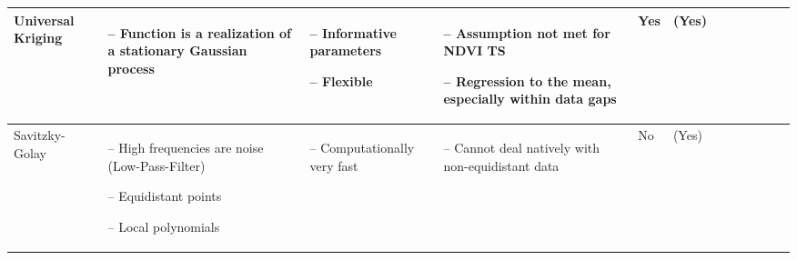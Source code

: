\begin{table}[!ht]
\begin{tabular}{p{1.6cm}p{3.3cm}p{3.3cm}p{3.4cm}p{0.4cm}p{0.4cm}p{3cm}p{3cm}p{3cm}p{3cm}p{2.7cm}p{3cm}|}
		Universal Kriging                                                                                                                                            &
		\begin{cptitemize} \item[--]  Function is a realization of a stationary Gaussian process                                      \end{cptitemize}               &
		\begin{cptitemize} \item[--]  Informative parameters \item[--]  Flexible                                                             \end{cptitemize}        &
		\begin{cptitemize} \item[--]  Assumption not met for NDVI TS \item[--] Regression to the mean, especially within data gaps          \end{cptitemize}        &
		Yes                                                                                                                                                          &
		(Yes)                \\ \hline%

		Savitzky-Golay                                                                                                                                         &
		\begin{cptitemize}
			\item[--]  High frequencies are noise (Low-Pass-Filter) \item[--]  Equidistant points \item[--]  Local polynomials\end{cptitemize}                                              &
		\begin{cptitemize} \item[--]  Computationally very fast                                                                   \end{cptitemize}                   &
		\begin{cptitemize} \item[--]  Cannot deal natively with non-equidistant data                             \end{cptitemize}                 &
		No                                                                                                                                                           &
		(Yes)                                                                                                                                                         \\ \hline%


\end{tabular}
\end{table}
